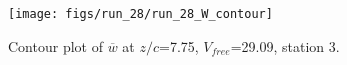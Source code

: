 \begin{figure}[H]
\centering
\texttt{[image: figs/run\_28/run\_28\_W\_contour]}
\caption{Contour plot of $\overline{w}$ at $z/c$=7.75, $V_{free}$=29.09, station 3.}
\label{fig:run_28_W_contour}
\end{figure}


